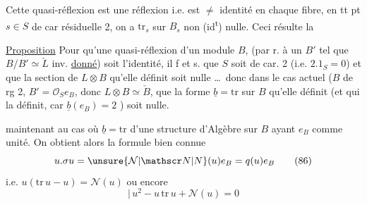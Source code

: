 
Cette quasi-réflexion est une
réflexion i.e. est $\ne$ identité en chaque fibre, 
en tt pt $s\in S$ de car résiduelle 2, on a
$\mathrm{tr}_s$ sur $B_s$ non (id\textsuperscript{t}) nulle. Ceci résulte  la

\uline{Proposition} Pour qu'une quasi-réflexion d'un
module    $B$, (par r. à un
$B'$ tel que $B/B'\simeq\check L$ inv. \uline{donné}) soit l'identité,
il f et s. que $S$ soit de car. 2 (i.e. $2.1_S=0$)
et que la  section de $L\otimes B$ qu'elle définit soit
nulle \ldots\ donc dans le cas actuel ($B$ de rg 2,
$B'=\mathcal O_S e_B$, donc $L\otimes B\simeq\check B$, que la forme $\underline b=\mathrm{tr}$
sur $B$ qu'elle définit (et qui la définit, car
$\underline b(e_B)=2$ \unsure{---|\ldots}) soit nulle.

 maintenant au cas où $\underline b=\mathrm{tr}$  
 d'une structure d'Algèbre sur $B$ ayant $e_B$ comme
unité. On obtient alors la formule bien connue
\[
u.\sigma u=\unsure{\mathcal N|\mathscr N|N}(u)e_B=q(u)e_B \tag*{(86)}
\]
i.e. \qquad $u(\mathrm{tr}\,u-u)=\mathcal N(u)$ \qquad ou encore
\[
\big|\,u^2-u\,\mathrm{tr}\,u+\mathcal N(u)=0 \tag*{(87)}
\]
